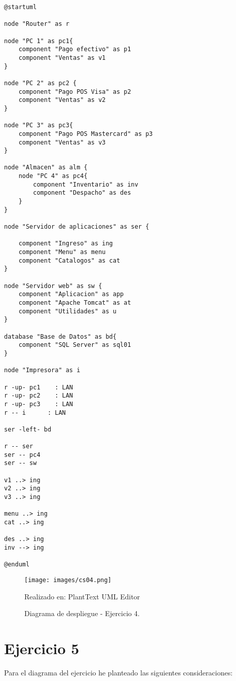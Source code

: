 \documentclass[a4paper,12pt]{article}
\begin{document}
\begin{lstlisting}
@startuml

node "Router" as r

node "PC 1" as pc1{
    component "Pago efectivo" as p1
    component "Ventas" as v1
}

node "PC 2" as pc2 {
    component "Pago POS Visa" as p2
    component "Ventas" as v2
}

node "PC 3" as pc3{
    component "Pago POS Mastercard" as p3
    component "Ventas" as v3
}

node "Almacen" as alm {
    node "PC 4" as pc4{
        component "Inventario" as inv
        component "Despacho" as des
    }
}

node "Servidor de aplicaciones" as ser {
    
    component "Ingreso" as ing
    component "Menu" as menu
    component "Catalogos" as cat
}

node "Servidor web" as sw {
    component "Aplicacion" as app
    component "Apache Tomcat" as at
    component "Utilidades" as u
}

database "Base de Datos" as bd{
    component "SQL Server" as sql01
}

node "Impresora" as i

r -up- pc1    : LAN
r -up- pc2    : LAN
r -up- pc3    : LAN
r -- i      : LAN

ser -left- bd

r -- ser
ser -- pc4
ser -- sw

v1 ..> ing
v2 ..> ing
v3 ..> ing

menu ..> ing
cat ..> ing

des ..> ing
inv --> ing

@enduml
\end{lstlisting}

\clearpage
\newpage

\begin{figure}[ht]
        \centering        
        \texttt{[image: images/cs04.png]}
        \caption{Diagrama de despliegue - Ejercicio 4.}  
        {{\footnotesize Realizado en: PlantText UML Editor }}
\end{figure}

\section*{Ejercicio 5}

Para el diagrama del ejercicio he planteado las siguientes consideraciones:
\end{document}
